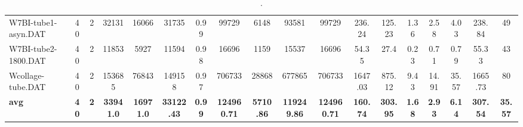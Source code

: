 \begin{sidewaystable}[h]
{\begin{tabular}{lccccccccccccccccc}
W7BI-tube1-asyn.DAT & 40 & 2 & 32131 & 16066 & 31735 & 0.99 & 99729 & 6148 & 93581 & 99729 & 236.24 & 125.23 & 1.36 & 2.58 & 4.03 & 238.84 & 49\\
W7BI-tube2-1800.DAT & 40 & 2 & 11853 & 5927 & 11594 & 0.98 & 16696 & 1159 & 15537 & 16696 & 54.35 & 27.4 & 0.23 & 0.71 & 0.79 & 55.33 & 43\\
Wcollage-tube.DAT & 40 & 2 & 153685 & 76843 & 149158 & 0.97 & 706733 & 28868 & 677865 & 706733 & 1647.03 & 875.12 & 9.43 & 14.91 & 35.57 & 1665.73 & 80\\
\cline{1-18} \textbf{avg} & \textbf{40} & \textbf{2} & \textbf{33941.0} & \textbf{16971.0} & \textbf{33122.43} & \textbf{0.99} & \textbf{124960.71} & \textbf{5710.86} & \textbf{119249.86} & \textbf{124960.71} & \textbf{160.74} & \textbf{303.95} & \textbf{1.68} & \textbf{2.93} & \textbf{6.14} & \textbf{307.54} & \textbf{35.57} \\ \cline{1-18}
\bottomrule
\end{tabular}%
}%
\caption{.}
\label{tab:table_bc}
\end{sidewaystable}

